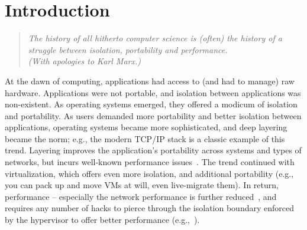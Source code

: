 \section{Introduction} 
\label{sec:introduction}

\begin{quote}
{\em 
The history of all hitherto computer science is (often) the history of a
struggle between isolation, portability and performance. \\ 
(With apologies to Karl Marx.)}
\end{quote}

At the dawn of computing, applications had access to (and had to manage) raw
hardware. Applications were not portable, and isolation between
applications was non-existent. As operating systems emerged, they offered a modicum 
of isolation and portability.  As users demanded more portability and better
isolation between applications, operating systems became more sophisticated,
and deep layering became the norm; e.g., the modern TCP/IP stack is a classic
example of this trend.  Layering improves the application's portability across
systems and types of  networks, but incurs well-known performance
issues~\cite{dcqcn,luigipapers}. The trend continued with virtualization, which offers even more isolation, and
additional portability (e.g., you can pack up and move VMs at will, even live-migrate
them). In return, performance -- especially the network performance is further
reduced~\cite{}, and requires any number of hacks to pierce through the
isolation boundary enforced by the hypervisor to offer better performance (e.g.,~\cite{sriov,netvm,netmap,dpdk}).





